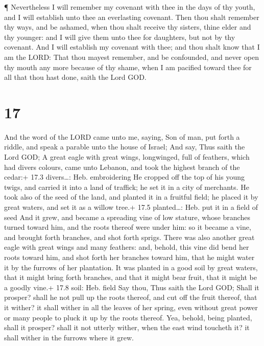  ¶ Nevertheless I will remember my covenant with thee in
the days of thy youth, and I will establish unto thee an everlasting
covenant.  Then thou shalt remember thy ways, and be
ashamed, when thou shalt receive thy sisters, thine elder and thy
younger: and I will give them unto thee for daughters, but not by thy
covenant.  And I will establish my covenant with thee; and
thou shalt know that I am the LORD:  That thou mayest
remember, and be confounded, and never open thy mouth any more because
of thy shame, when I am pacified toward thee for all that thou hast
done, saith the Lord GOD.

\hypertarget{section-16}{%
\section{17}\label{section-16}}

 And the word of the LORD came unto me, saying, 
Son of man, put forth a riddle, and speak a parable unto the house of
Israel;  And say, Thus saith the Lord GOD; A great eagle
with great wings, longwinged, full of feathers, which had divers
colours, came unto Lebanon, and took the highest branch of the cedar:+
17.3 divers\ldots: Heb. embroidering  He cropped off the top
of his young twigs, and carried it into a land of traffick; he set it in
a city of merchants.  He took also of the seed of the land,
and planted it in a fruitful field; he placed it by great waters, and
set it as a willow tree.+ 17.5 planted\ldots: Heb. put it in a field of
seed  And it grew, and became a spreading vine of low
stature, whose branches turned toward him, and the roots thereof were
under him: so it became a vine, and brought forth branches, and shot
forth sprigs.  There was also another great eagle with great
wings and many feathers: and, behold, this vine did bend her roots
toward him, and shot forth her branches toward him, that he might water
it by the furrows of her plantation.  It was planted in a
good soil by great waters, that it might bring forth branches, and that
it might bear fruit, that it might be a goodly vine.+ 17.8 soil: Heb.
field  Say thou, Thus saith the Lord GOD; Shall it prosper?
shall he not pull up the roots thereof, and cut off the fruit thereof,
that it wither? it shall wither in all the leaves of her spring, even
without great power or many people to pluck it up by the roots thereof.
 Yea, behold, being planted, shall it prosper? shall it not
utterly wither, when the east wind toucheth it? it shall wither in the
furrows where it grew.

